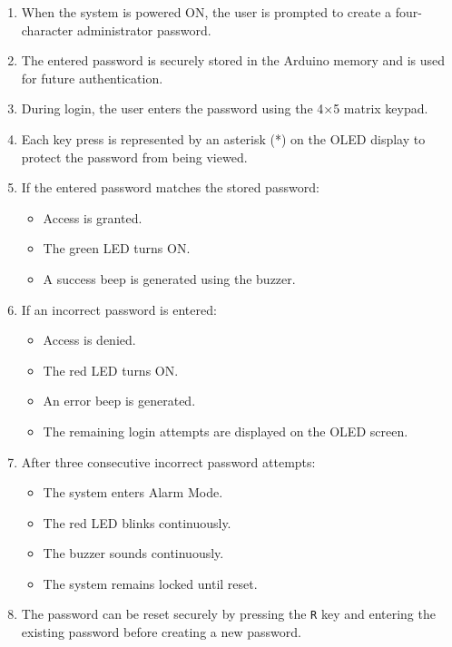 \begin{enumerate}

\item When the system is powered ON, the user is prompted to create a four-character administrator password.

\item The entered password is securely stored in the Arduino memory and is used for future authentication.

\item During login, the user enters the password using the 4×5 matrix keypad.

\item Each key press is represented by an asterisk (*) on the OLED display to protect the password from being viewed.

\item If the entered password matches the stored password:

\begin{itemize}
    \item Access is granted.
    \item The green LED turns ON.
    \item A success beep is generated using the buzzer.
\end{itemize}

\item If an incorrect password is entered:

\begin{itemize}
    \item Access is denied.
    \item The red LED turns ON.
    \item An error beep is generated.
    \item The remaining login attempts are displayed on the OLED screen.
\end{itemize}

\item After three consecutive incorrect password attempts:

\begin{itemize}
    \item The system enters Alarm Mode.
    \item The red LED blinks continuously.
    \item The buzzer sounds continuously.
    \item The system remains locked until reset.
\end{itemize}

\item The password can be reset securely by pressing the \texttt{R} key and entering the existing password before creating a new password.

\end{enumerate}

